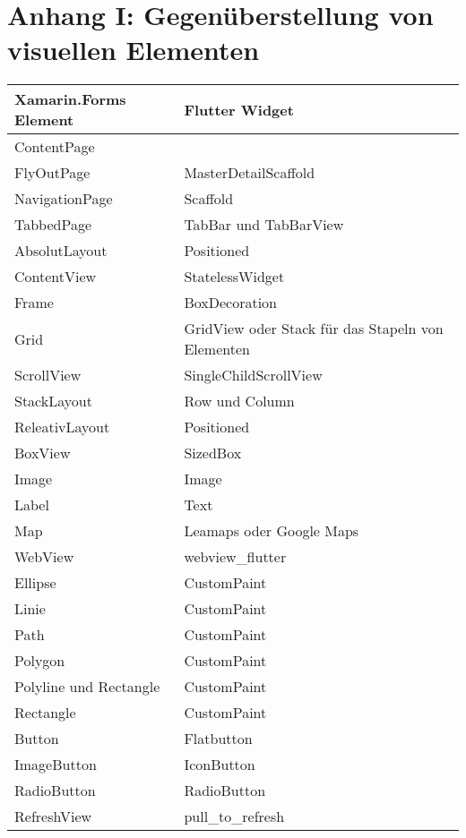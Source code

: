 \backmatter      %


\chapter{Anhang I: Gegenüberstellung von visuellen Elementen }
\label{chap:Gegenueberstellung}

\begin{xltabular}{\textwidth}{|X|X|}
\hline

   \textbf{Xamarin.Forms Element} & \textbf{Flutter Widget}  \\  
\hline
	ContentPage            			&           											\\ 
	FlyOutPage             			& 			MasterDetailScaffold          	\\ 
	NavigationPage       			& 			Scaffold         	 					\\ 
	TabbedPage            			& 			TabBar und TabBarView 		\\ 
	AbsolutLayout       				&  		Positioned	 			\\ 
	ContentView       				&  		StatelessWidget	 			\\ 
	Frame       							&  		BoxDecoration     	 			\\ 
	Grid            						&  		GridView oder Stack für das Stapeln von Elementen						\\ 
	ScrollView            				&  		SingleChildScrollView		\\ 
	StackLayout       				&  		Row und Column  	 			\\ 
	ReleativLayout           		&  		Positioned		\\ 
	BoxView		       				&   	 	SizedBox  		\\ 
	Image       							&	     	Image	 			\\ 
	Label       							&  		Text 					\\ 
	Map            						&	   		Leamaps oder Google Maps \\ 
	WebView            				&  		webview\_flutter	\\ 
	Ellipse								&  		CustomPaint	\\ 
	Linie									&	  		CustomPaint	\\ 
	Path  								&  		CustomPaint	\\ 
	Polygon  							&  		CustomPaint	\\ 
	Polyline und Rectangle  	&  		CustomPaint	\\ 
	Rectangle  						&  		CustomPaint	\\ 
	Button		       					&  		Flatbutton 		\\ 
	ImageButton		       			&  		IconButton 		\\ 
	RadioButton		       			&  		RadioButton 		\\ 
	RefreshView		       			&  		pull\_to\_refresh 		\\ 
	\hline


\end{xltabular}
